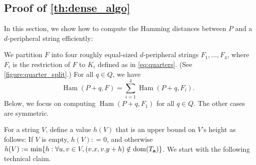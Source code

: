 \documentclass[twoside,leqno]{article}
\DeclareMathOperator*{\Ham}{Ham}
\begin{document}
\subsection{Proof of \cref{th:dense_algo}}
In this section, we show how to compute the Hamming distances between $P$ and a $d$-peripheral string efficiently:

\restateThmDenseAlgo

We partition $F$ into four roughly equal-sized $d$-peripheral strings $F_1, \dots, F_4$, where $F_i$ is the restriction of $F$ to $K_i$ defined as in \cref{eq:quarters}. (See \cref{figure:quarter_split}.) For all $q \in Q$, we have 
%
$$\Ham(P + q, F) = \sum_{i = 1}^4 \Ham(P + q, F_i).$$
%
Below, we focus on computing $\Ham(P + q, F_1)$ for all $q \in Q$. The other cases are symmetric. 

For a string $V$, define a value $h(V)$ that is an upper bound on $V$'s height as follows: If $V$ is empty, $h(V): = 0$, and otherwise $h(V) := \min \{h : \forall u,v \in V, (v.x, v.y + h) \notin \operatorname*{dom}(T_\mathbf{a})\}$. We start with the following technical claim.
\end{document}
